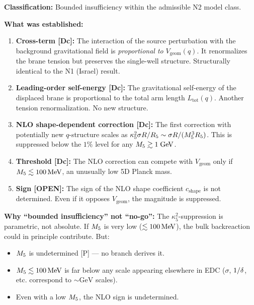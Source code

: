 \begin{resultbox}[title=N2 WP2 Outcome: Bounded Insufficiency
    (Structural $\kappa_5^2$-Suppression)]

\textbf{Classification:} Bounded insufficiency within the admissible
N2 model class.

\textbf{What was established:}
\begin{enumerate}
    \item \textbf{Cross-term [Dc]:} The interaction of the source
    perturbation with the background gravitational field is
    \emph{proportional to} $V_{\mathrm{geom}}(q)$. It renormalizes
    the brane tension but preserves the single-well structure.
    Structurally identical to the N1 (Israel) result.

    \item \textbf{Leading-order self-energy [Dc]:} The gravitational
    self-energy of the displaced brane is proportional to the total
    arm length $L_{\mathrm{tot}}(q)$. Another tension renormalization.
    No new structure.

    \item \textbf{NLO shape-dependent correction [Dc]:} The first
    correction with potentially new $q$-structure scales as
    $\kappa_5^2 \sigma R / R_5 \sim \sigma R / (M_5^3 R_5)$.
    This is suppressed below the $1\%$ level for any
    $M_5 \gtrsim 1\;\mathrm{GeV}$.

    \item \textbf{Threshold [Dc]:} The NLO correction can compete
    with $V_{\mathrm{geom}}$ only if $M_5 \lesssim 100\,\mathrm{MeV}$,
    an unusually low 5D Planck mass.

    \item \textbf{Sign [OPEN]:} The sign of the NLO shape coefficient
    $c_{\mathrm{shape}}$ is not determined. Even if it opposes
    $V_{\mathrm{geom}}$, the magnitude is suppressed.
\end{enumerate}

\textbf{Why ``bounded insufficiency'' not ``no-go'':}
The $\kappa_5^2$-suppression is parametric, not absolute. If
$M_5$ is very low ($\lesssim 100\,\mathrm{MeV}$), the bulk backreaction
could in principle contribute. But:
\begin{itemize}
    \item $M_5$ is undetermined [P] --- no branch derives it.
    \item $M_5 \lesssim 100\,\mathrm{MeV}$ is far below any scale
          appearing elsewhere in EDC ($\sigma$, $1/\delta$, etc.
          correspond to $\sim\mathrm{GeV}$ scales).
    \item Even with a low $M_5$, the NLO sign is undetermined.
\end{itemize}


\end{resultbox}
